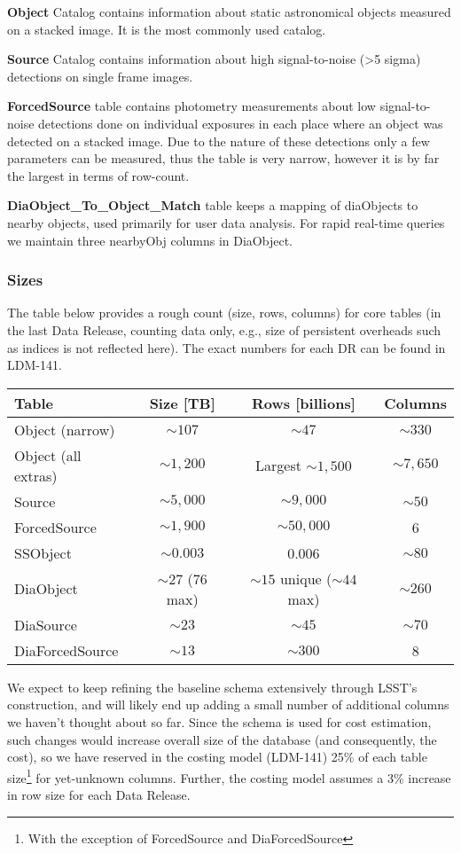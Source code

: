 \documentclass[DM,toc]{lsstdoc}
\begin{document}
\textbf{Object} Catalog contains information about static astronomical objects measured on a stacked image. It is the most commonly used catalog.

\textbf{Source} Catalog contains information about high signal-to-noise (>5 sigma) detections on single frame images.

\textbf{ForcedSource} table contains photometry measurements about low signal-to-noise detections done on individual exposures in each place where an object was detected on a stacked image. Due to the nature of these detections only a few parameters can be measured, thus the table is very narrow, however it is by far the largest in terms of row-count.

\textbf{DiaObject\_To\_Object\_Match} table keeps a mapping of diaObjects to nearby objects, used primarily for user data analysis. For rapid real-time queries we maintain three nearbyObj columns in DiaObject.

\subsubsection{Sizes}

The table below provides a rough count (size, rows, columns) for core tables (in the last Data Release, counting data only, e.g., size of persistent overheads such as indices is not reflected here). The exact numbers for each DR can be found in LDM-141.

\begin{tabular}{lccc}
  \hline\hline
  Table & Size [TB] & Rows  [billions] & Columns \\
  \hline\hline
  Object (narrow) & $\sim107$ & $\sim47$ & $\sim330$ \\
  Object (all extras) & $\sim1,200$ & Largest $\sim1,500$ & $\sim7,650$ \\
  Source & $\sim5,000$ & $\sim9,000$ & $\sim50$ \\
  ForcedSource & $\sim1,900$ & $\sim50,000$ & 6 \\
  SSObject & $\sim0.003$ & 0.006 & $\sim80$ \\
  DiaObject & $\sim27$ (76 max) & $\sim15$ unique ($\sim44$ max) & $\sim260$ \\
  DiaSource & $\sim23$ & $\sim45$ & $\sim70$ \\
  DiaForcedSource & $\sim13$ & $\sim300$ & 8 \\
  \hline
\end{tabular}

We expect to keep refining the baseline schema extensively through LSST’s construction, and will likely end up adding a small number of additional columns we haven’t thought about so far. Since the schema is used for cost estimation, such changes would increase overall size of the database (and consequently, the cost), so we have reserved in the costing model (LDM-141) 25\% of each table size\footnote{With the exception of ForcedSource and DiaForcedSource} for yet-unknown columns. Further, the costing model assumes a 3\% increase in row size for each Data Release.
\end{document}
